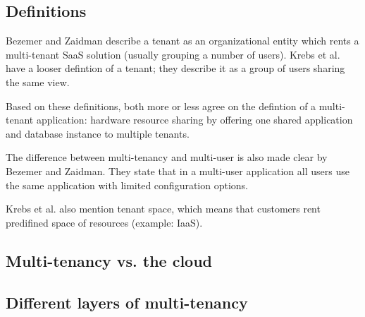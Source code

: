 
\subsection{Definitions}

Bezemer and Zaidman\cite{bezemer2010multi} describe a tenant as an organizational entity which rents a multi-tenant SaaS solution (usually grouping a number of users). Krebs et al.\cite{krebs2012architecture} have a looser defintion of a tenant; they describe it as a group of users sharing the same view.

Based on these definitions, both more or less agree on the defintion of a multi-tenant application: hardware resource sharing by offering one shared application and database instance to multiple tenants.

The difference between multi-tenancy and multi-user is also made clear by Bezemer and Zaidman. They state that in a multi-user application all users use the same application with limited configuration options. %

Krebs et al. also mention tenant space, which means that customers rent predifined space of resources (example: IaaS).


\subsection{Multi-tenancy vs. the cloud}


\subsection{Different layers of multi-tenancy}



